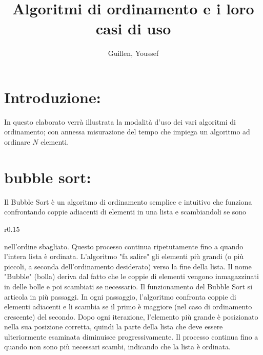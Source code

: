\documentclass[a4paper]{article}
\author{Guillen, Youssef}
\title{Algoritmi di ordinamento e i loro casi di uso}
\begin{document}
\maketitle
\section*{Introduzione:}
In questo elaborato verrà illustrata la modalità d’uso dei vari algoritmi di ordinamento; con annessa misurazione del tempo che impiega un 
algoritmo ad ordinare \(N\) elementi.
\section{bubble sort:}
Il Bubble Sort è un algoritmo di ordinamento semplice e intuitivo che funziona confrontando coppie adiacenti di elementi in una lista e scambiandoli se sono 
\begin{wrapfigure}{r}{0.15\textwidth}
    \centering
\end{wrapfigure}
nell'ordine sbagliato. Questo processo continua ripetutamente fino a quando l'intera lista è ordinata. L'algoritmo "fa salire" gli elementi 
più grandi (o più piccoli, a seconda dell'ordinamento desiderato) verso la fine della lista.
Il nome "Bubble" (bolla) deriva dal fatto che le coppie di elementi vengono inmagazzinati in delle bolle e poi scambiati se necessario.
Il funzionamento del Bubble Sort si articola in più passaggi. In ogni passaggio, l'algoritmo confronta coppie di elementi adiacenti e li scambia se il primo è 
maggiore (nel caso di ordinamento crescente) del secondo. Dopo ogni iterazione, l'elemento più grande è posizionato nella sua posizione corretta, quindi la parte 
della lista che deve essere ulteriormente esaminata diminuisce progressivamente. Il processo continua fino a quando non sono più necessari scambi, 
indicando che la lista è ordinata.
\end{document}
